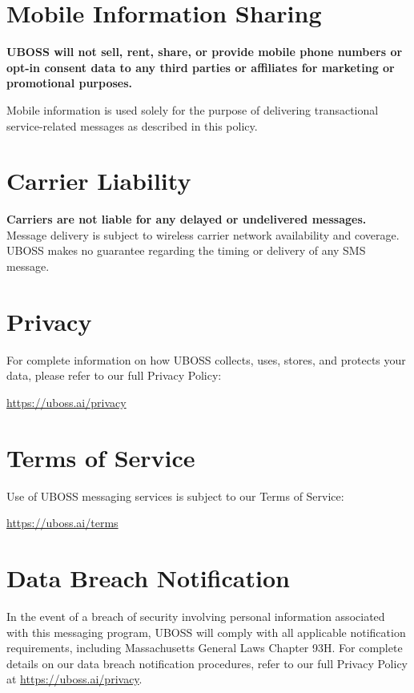 \documentclass[11pt]{article}
\begin{document}
\section{Mobile Information Sharing}

\textbf{UBOSS will not sell, rent, share, or provide mobile phone numbers or opt-in consent data to any third parties or affiliates for marketing or promotional purposes.}

Mobile information is used solely for the purpose of delivering transactional service-related messages as described in this policy.

\section{Carrier Liability}

\textbf{Carriers are not liable for any delayed or undelivered messages.} Message delivery is subject to wireless carrier network availability and coverage. UBOSS makes no guarantee regarding the timing or delivery of any SMS message.

\section{Privacy}

For complete information on how UBOSS collects, uses, stores, and protects your data, please refer to our full Privacy Policy:

\begin{center}
    \url{https://uboss.ai/privacy}
\end{center}

\section{Terms of Service}

Use of UBOSS messaging services is subject to our Terms of Service:

\begin{center}
    \url{https://uboss.ai/terms}
\end{center}

\section{Data Breach Notification}

In the event of a breach of security involving personal 
information associated with this messaging program, 
UBOSS will comply with all applicable notification 
requirements, including Massachusetts General Laws 
Chapter 93H. For complete details on our data breach 
notification procedures, refer to our full Privacy Policy 
at \url{https://uboss.ai/privacy}.
\end{document}
